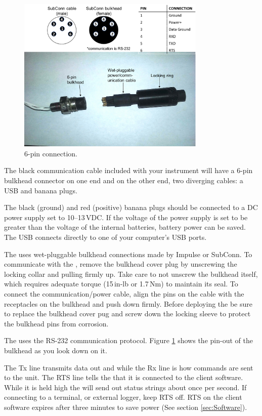 \begin{figure}[t]
\centering
\includegraphics[width=0.8\textwidth]{figs/Subconn_cable.png}
\caption{\instType{} 6-pin connection.}
\label{fig:Subconn}
\end{figure}

\or		%

The black communication cable included with your instrument will have a 6-pin bulkhead connector on one end and on the other end, two diverging cables: a USB and banana plugs. 

The black (ground) and red (positive) banana plugs should be connected to a DC power supply set to 10--13\,VDC. If the voltage of the power supply is set to be greater than the voltage of the internal batteries, battery power can be saved. The USB connects directly to one of your computer's USB ports.

The \instType{} uses wet-pluggable bulkhead connections made by Impulse or SubConn.  To communicate with the \instType{}, remove the bulkhead cover plug by unscrewing the locking collar and pulling firmly up. Take care to not unscrew the bulkhead itself, which requires adequate torque (15\,in-lb or 1.7\,Nm) to maintain its seal. To connect the communication/power cable, align the pins on the cable with the receptacles on the \instType{} bulkhead and push down firmly. Before deploying the \instType{} be sure to replace the bulkhead cover pug and screw down the locking sleeve to protect the bulkhead pins from corrosion.

The \instType{} uses the RS-232 communication protocol. Figure \ref{fig:Subconn} shows the pin-out of the bulkhead as you look down on it.

The Tx line transmits data out and while the Rx line is how commands are sent to the unit. The RTS line tells the \instType{} that it is connected to the client software. While it is held high the \instType{} will send out status strings about once per second. If connecting to a terminal, or external logger, keep RTS off.  RTS on the client software expires after three minutes to save power (See section \ref{sec:Software}).

